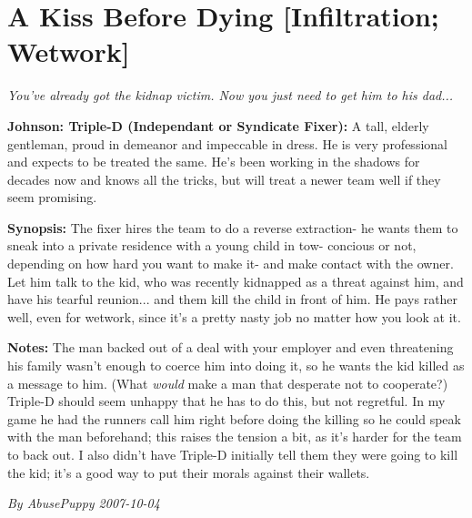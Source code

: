 \documentclass[letterpaper,twocolumn,10.5pt]{article}
\newenvironment{scenario}[6]
	{
		\section{#1 {\small[#2]}}
		\textit{#3}
		\def\TMPSCENARIO{#4 #5}
	}
	{\small\textit{By \TMPSCENARIO}}
\newcommand{\johnson}[2]{\textbf{Johnson: #1 (#2):}}
\newcommand{\synopsis}{\textbf{Synopsis: }}
\newcommand{\notes}{\textbf{Notes: }}
\begin{document}
\begin{scenario}{A Kiss Before Dying}
	{Infiltration; Wetwork}
	{ You've already got the kidnap victim. Now you just need to get him to his dad...}
	{AbusePuppy}
	{2007-10-04}
	{https://forum.rpg.net/showthread.php?321504-Shadowrun-4th-101-Instant-Scenarios\&p=7898113#post7898113}

\johnson{Triple-D}{Independant or Syndicate Fixer} A tall, elderly gentleman, proud in demeanor and impeccable in dress. He is very professional and expects to be treated the same. He's been working in the shadows for decades now and knows all the tricks, but will treat a newer team well if they seem promising.

\synopsis The fixer hires the team to do a reverse extraction- he wants them to sneak into a private residence with a young child in tow- concious or not, depending on how hard you want to make it- and make contact with the owner. Let him talk to the kid, who was recently kidnapped as a threat against him, and have his tearful reunion... and them kill the child in front of him. He pays rather well, even for wetwork, since it's a pretty nasty job no matter how you look at it.

\notes The man backed out of a deal with your employer and even threatening his family wasn't enough to coerce him into doing it, so he wants the kid killed as a message to him. (What \textit{would} make a man that desperate not to cooperate?) Triple-D should seem unhappy that he has to do this, but not regretful. In my game he had the runners call him right before doing the killing so he could speak with the man beforehand; this raises the tension a bit, as it's harder for the team to back out. I also didn't have Triple-D initially tell them they were going to kill the kid; it's a good way to put their morals against their wallets. 

\end{scenario}
\end{document}
